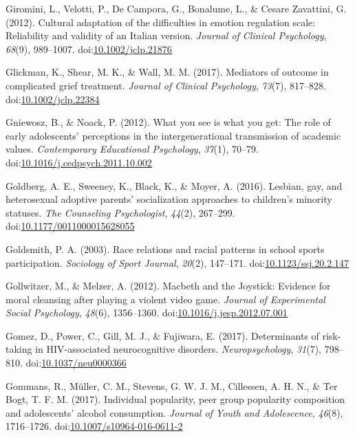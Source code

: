 \documentclass[english,man]{apa6}
\theoremstyle{definition}
\theoremstyle{definition}
\theoremstyle{definition}
\theoremstyle{remark}
\begin{document}
\hypertarget{ref-Giromini2012}{}
Giromini, L., Velotti, P., De Campora, G., Bonalume, L., \& Cesare
Zavattini, G. (2012). Cultural adaptation of the difficulties in emotion
regulation scale: Reliability and validity of an Italian version.
\emph{Journal of Clinical Psychology}, \emph{68}(9), 989--1007.
doi:\href{https://doi.org/10.1002/jclp.21876}{10.1002/jclp.21876}

\hypertarget{ref-Glickman2017}{}
Glickman, K., Shear, M. K., \& Wall, M. M. (2017). Mediators of outcome
in complicated grief treatment. \emph{Journal of Clinical Psychology},
\emph{73}(7), 817--828.
doi:\href{https://doi.org/10.1002/jclp.22384}{10.1002/jclp.22384}

\hypertarget{ref-Gniewosz2012}{}
Gniewosz, B., \& Noack, P. (2012). What you see is what you get: The
role of early adolescents' perceptions in the intergenerational
transmission of academic values. \emph{Contemporary Educational
Psychology}, \emph{37}(1), 70--79.
doi:\href{https://doi.org/10.1016/j.cedpsych.2011.10.002}{10.1016/j.cedpsych.2011.10.002}

\hypertarget{ref-Goldberg2016}{}
Goldberg, A. E., Sweeney, K., Black, K., \& Moyer, A. (2016). Lesbian,
gay, and heterosexual adoptive parents' socialization approaches to
children's minority statuses. \emph{The Counseling Psychologist},
\emph{44}(2), 267--299.
doi:\href{https://doi.org/10.1177/0011000015628055}{10.1177/0011000015628055}

\hypertarget{ref-Goldsmith2003}{}
Goldsmith, P. A. (2003). Race relations and racial patterns in school
sports participation. \emph{Sociology of Sport Journal}, \emph{20}(2),
147--171.
doi:\href{https://doi.org/10.1123/ssj.20.2.147}{10.1123/ssj.20.2.147}

\hypertarget{ref-Gollwitzer2012}{}
Gollwitzer, M., \& Melzer, A. (2012). Macbeth and the Joystick: Evidence
for moral cleansing after playing a violent video game. \emph{Journal of
Experimental Social Psychology}, \emph{48}(6), 1356--1360.
doi:\href{https://doi.org/10.1016/j.jesp.2012.07.001}{10.1016/j.jesp.2012.07.001}

\hypertarget{ref-Gomez2017}{}
Gomez, D., Power, C., Gill, M. J., \& Fujiwara, E. (2017). Determinants
of risk-taking in HIV-associated neurocognitive disorders.
\emph{Neuropsychology}, \emph{31}(7), 798--810.
doi:\href{https://doi.org/10.1037/neu0000366}{10.1037/neu0000366}

\hypertarget{ref-Gommans2017}{}
Gommans, R., Müller, C. M., Stevens, G. W. J. M., Cillessen, A. H. N.,
\& Ter Bogt, T. F. M. (2017). Individual popularity, peer group
popularity composition and adolescents' alcohol consumption.
\emph{Journal of Youth and Adolescence}, \emph{46}(8), 1716--1726.
doi:\href{https://doi.org/10.1007/s10964-016-0611-2}{10.1007/s10964-016-0611-2}
\end{document}
